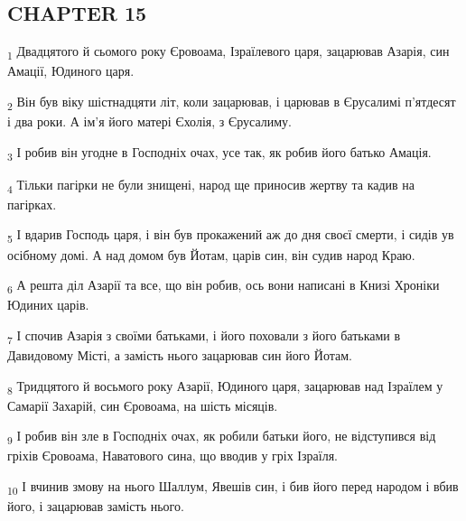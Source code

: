 \subsection{CHAPTER 15}
\begin{tcolorbox}
\textsubscript{1} Двадцятого й сьомого року Єровоама, Ізраїлевого царя, зацарював Азарія, син Амації, Юдиного царя.
\end{tcolorbox}
\begin{tcolorbox}
\textsubscript{2} Він був віку шістнадцяти літ, коли зацарював, і царював в Єрусалимі п'ятдесят і два роки. А ім'я його матері Єхолія, з Єрусалиму.
\end{tcolorbox}
\begin{tcolorbox}
\textsubscript{3} І робив він угодне в Господніх очах, усе так, як робив його батько Амація.
\end{tcolorbox}
\begin{tcolorbox}
\textsubscript{4} Тільки пагірки не були знищені, народ ще приносив жертву та кадив на пагірках.
\end{tcolorbox}
\begin{tcolorbox}
\textsubscript{5} І вдарив Господь царя, і він був прокажений аж до дня своєї смерти, і сидів ув осібному домі. А над домом був Йотам, царів син, він судив народ Краю.
\end{tcolorbox}
\begin{tcolorbox}
\textsubscript{6} А решта діл Азарії та все, що він робив, ось вони написані в Книзі Хроніки Юдиних царів.
\end{tcolorbox}
\begin{tcolorbox}
\textsubscript{7} І спочив Азарія з своїми батьками, і його поховали з його батьками в Давидовому Місті, а замість нього зацарював син його Йотам.
\end{tcolorbox}
\begin{tcolorbox}
\textsubscript{8} Тридцятого й восьмого року Азарії, Юдиного царя, зацарював над Ізраїлем у Самарії Захарій, син Єровоама, на шість місяців.
\end{tcolorbox}
\begin{tcolorbox}
\textsubscript{9} І робив він зле в Господніх очах, як робили батьки його, не відступився від гріхів Єровоама, Наватового сина, що вводив у гріх Ізраїля.
\end{tcolorbox}
\begin{tcolorbox}
\textsubscript{10} І вчинив змову на нього Шаллум, Явешів син, і бив його перед народом і вбив його, і зацарював замість нього.
\end{tcolorbox}
